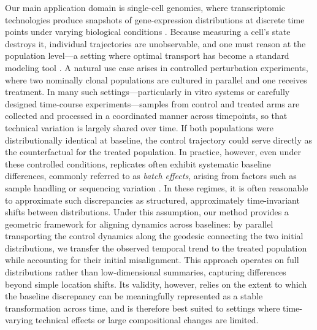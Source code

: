 \documentclass[11pt]{article}
\begin{document}
Our main application domain is single-cell genomics, where transcriptomic technologies produce snapshots of gene-expression distributions at discrete time points under varying biological conditions \citep{schiebinger2019optimal, schiebinger2021reconstructing, lavenant2024toward}. Because measuring a cell's state destroys it, individual trajectories are unobservable, and one must reason at the population level---a setting where optimal transport has become a standard modeling tool \citep{bunne2024optimal}. A natural use case arises in controlled perturbation experiments, where two nominally clonal populations are cultured in parallel and one receives treatment. In many such settings—particularly in vitro systems or carefully designed time-course experiments—samples from control and treated arms are collected and processed in a coordinated manner across timepoints, so that technical variation is largely shared over time. If both populations were distributionally identical at baseline, the control trajectory could serve directly as the counterfactual for the treated population. In practice, however, even under these controlled conditions, replicates often exhibit systematic baseline differences, commonly referred to as \emph{batch effects}, arising from factors such as sample handling or sequencing variation \citep{tran2020benchmark, luecken2022benchmarking}. In these regimes, it is often reasonable to approximate such discrepancies as structured, approximately time-invariant shifts between distributions. Under this assumption, our method provides a geometric framework for aligning dynamics across baselines: by parallel transporting the control dynamics along the geodesic connecting the two initial distributions, we transfer the observed temporal trend to the treated population while accounting for their initial misalignment. This approach operates on full distributions rather than low-dimensional summaries, capturing differences beyond simple location shifts. Its validity, however, relies on the extent to which the baseline discrepancy can be meaningfully represented as a stable transformation across time, and is therefore best suited to settings where time-varying technical effects or large compositional changes are limited.
\end{document}
